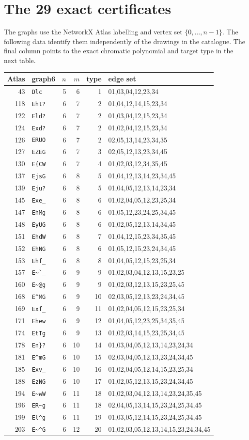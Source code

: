 \documentclass[11pt]{article}
\begin{document}
\section{The 29 exact certificates}

The graphs use the NetworkX Atlas labelling and vertex set
$\{0,\ldots,n-1\}$.  The following data identify them independently of the
drawings in the catalogue.  The final column points to the exact chromatic
polynomial and target type in the next table.

\scriptsize
\begin{longtable}{r@{\quad}lrrr@{\quad}p{8.2cm}}
Atlas&graph6&$n$&$m$&type&edge set\\ \hline
43&\verb|Dlc|&5&6&1&01,03,04,12,23,34\\
118&\verb|Eht?|&6&7&2&01,04,12,14,15,23,34\\
122&\verb|Eld?|&6&7&2&01,03,04,12,15,23,34\\
124&\verb|Exd?|&6&7&2&01,02,04,12,15,23,34\\
126&\verb|ERUO|&6&7&2&02,05,13,14,23,34,35\\
127&\verb|EZEG|&6&7&3&02,05,12,13,23,34,45\\
130&\verb|E{CW|&6&7&4&01,02,03,12,34,35,45\\
137&\verb|EjsG|&6&8&5&01,04,12,13,14,23,34,45\\
139&\verb|Eju?|&6&8&5&01,04,05,12,13,14,23,34\\
145&\verb|Exe_|&6&8&6&01,02,04,05,12,23,25,34\\
147&\verb|EhMg|&6&8&6&01,05,12,23,24,25,34,45\\
148&\verb|EyUG|&6&8&6&01,02,05,12,13,14,34,45\\
151&\verb|EhdW|&6&8&7&01,04,12,15,23,34,35,45\\
152&\verb|EhNG|&6&8&6&01,05,12,15,23,24,34,45\\
153&\verb|Ehf_|&6&8&8&01,04,05,12,15,23,25,34\\
157&\verb|E~`_|&6&9&9&01,02,03,04,12,13,15,23,25\\
160&\verb|E~@g|&6&9&9&01,02,03,12,13,15,23,25,45\\
168&\verb|E^MG|&6&9&10&02,03,05,12,13,23,24,34,45\\
169&\verb|Exf_|&6&9&11&01,02,04,05,12,15,23,25,34\\
171&\verb|Ehew|&6&9&12&01,04,05,12,23,25,34,35,45\\
174&\verb|EtTg|&6&9&13&01,02,03,14,15,23,25,34,45\\
178&\verb|En}?|&6&10&14&01,03,04,05,12,13,14,23,24,34\\
181&\verb|E^mG|&6&10&15&02,03,04,05,12,13,23,24,34,45\\
185&\verb|Exv_|&6&10&16&01,02,04,05,12,14,15,23,25,34\\
188&\verb|EzNG|&6&10&17&01,02,05,12,13,15,23,24,34,45\\
194&\verb|E~wW|&6&11&18&01,02,03,04,12,13,14,23,24,35,45\\
196&\verb|ER~g|&6&11&18&02,04,05,13,14,15,23,24,25,34,45\\
199&\verb|El^g|&6&11&19&01,03,05,12,14,15,23,24,25,34,45\\
203&\verb|E~^G|&6&12&20&01,02,03,05,12,13,14,15,23,24,34,45
\end{longtable}
\end{document}
